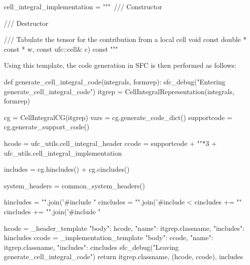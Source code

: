 \begin{python}
cell_integral_implementation = """\
/// Constructor
{
}

/// Destructor
{
}

/// Tabulate the tensor for the contribution from a local cell
void %
                                    const double * const * w,
                                    const ufc::cell& c) const
{
}
"""
\end{python}
Using this template, the code generation in SFC is then performed as follows:  
\begin{python}
def generate_cell_integral_code(integrals, formrep):
    sfc_debug("Entering generate_cell_integral_code")
    itgrep = CellIntegralRepresentation(integrals, formrep)
    
    cg = CellIntegralCG(itgrep)
    vars = cg.generate_code_dict()
    supportcode = cg.generate_support_code()

    hcode = ufc_utils.cell_integral_header %
    ccode = supportcode + "\n"*3 + ufc_utils.cell_integral_implementation %
    
    includes = cg.hincludes() + cg.cincludes()

    system_headers = common_system_headers()
    
    hincludes = "\n".join('#include "%
    cincludes =  "\n".join('#include <%
    cincludes += "\n"
    cincludes += "\n".join('#include "%
    
    hcode = _header_template         %
             { "body": hcode, "name": itgrep.classname, "includes": hincludes }
    ccode = _implementation_template %
             { "body": ccode, "name": itgrep.classname, "includes": cincludes }
    sfc_debug("Leaving generate_cell_integral_code")
    return itgrep.classname, (hcode, ccode), includes
\end{python}

